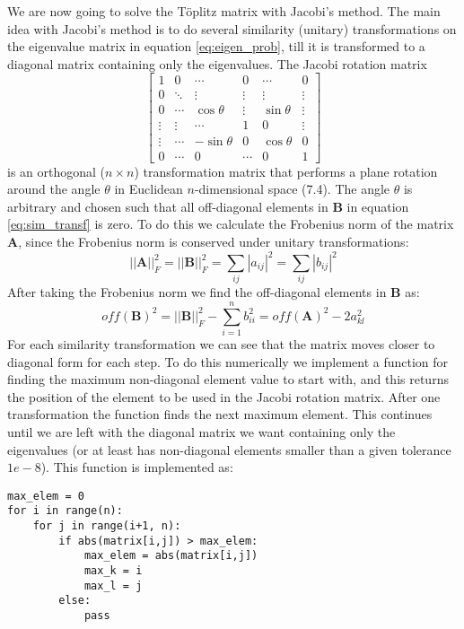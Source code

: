 \documentclass[12pt,a4paper,english]{article}
\begin{document}
We are now going to solve the Töplitz matrix with Jacobi's method. The main idea with Jacobi's method is to do several similarity (unitary) transformations on the eigenvalue matrix in equation \ref{eq:eigen_prob}, till it is transformed to a diagonal matrix containing only the eigenvalues. The Jacobi rotation matrix 
\begin{equation}
\label{eq:jacobi_rotate}
\begin{bmatrix}
1 & 0 & \cdots & 0 & \cdots & 0\\
0 & \ddots & \vdots &\vdots & \vdots & \vdots\\
0 & \cdots & \cos\theta & \vdots & \sin\theta & \vdots\\
\vdots & \vdots & \cdots & 1 & 0 & \vdots\\
\vdots & \cdots & -\sin\theta & 0 & \cos\theta & 0 \\
0 & \cdots & 0 & \cdots & 0 & 1
\end{bmatrix}
\end{equation}
is an orthogonal ($n\times n$) transformation matrix that performs a plane rotation around the angle $\theta$ in Euclidean $n$-dimensional space \cite{lectures}(7.4). The angle $\theta$ is arbitrary and chosen such that all off-diagonal elements in \textbf{B} in equation \ref{eq:sim_transf} is zero. To do this we calculate the Frobenius norm of the matrix \textbf{A}, since the Frobenius norm is conserved under unitary transformations:
\begin{equation}
\label{eq:Frobenius}
||\textbf{A}||_F^2 = ||\textbf{B}||_F^2=\sum_{ij}|a_{ij}|^2=\sum_{ij}|b_{ij}|^2
\end{equation}
After taking the Frobenius norm we find the off-diagonal elements in \textbf{B} as:
\begin{equation}
\label{eq:off_diag}
off(\textbf{B})^2=||\textbf{B}||_F^2-\sum_{i=1}^{n}b_{ii}^2=off(\textbf{A})^2-2a_{kl}^2
\end{equation}
For each similarity transformation we can see that the matrix moves closer to diagonal form for each step. To do this numerically we implement a function for finding the maximum non-diagonal element value to start with, and this returns the position of the element to be used in the Jacobi rotation matrix. After one transformation the function finds the next maximum element. This continues until we are left with the diagonal matrix we want containing only the eigenvalues (or at least has non-diagonal elements smaller than a given tolerance $1e-8$). This function is implemented as:
\begin{lstlisting}
max_elem = 0
for i in range(n):
	for j in range(i+1, n):
		if abs(matrix[i,j]) > max_elem:
			max_elem = abs(matrix[i,j])
			max_k = i
			max_l = j
		else:
			pass
\end{lstlisting}
\end{document}
